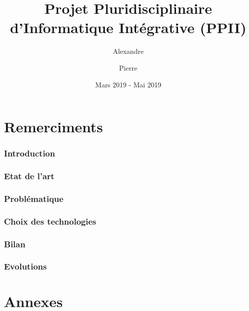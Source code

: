 \documentclass{article}
\title{Projet Pluridisciplinaire d'Informatique Intégrative (PPII)}
\author{
    Alexandre \sc{Cesari}
    \and
    Pierre \sc{Bouillon}
}
\date{Mars 2019 - Mai 2019}
\begin{document}
\maketitle

\newpage


\tableofcontents{}

\newpage


\part*{Remerciments}

\newpage


\section{Introduction}

\newpage


\section{Etat de l'art}

\newpage


\section{Problématique}

\newpage


\section{Choix des technologies}

\newpage


\section{Bilan}

\newpage


\section{Evolutions}

\newpage

\part*{Annexes}

\newpage
\end{document}
